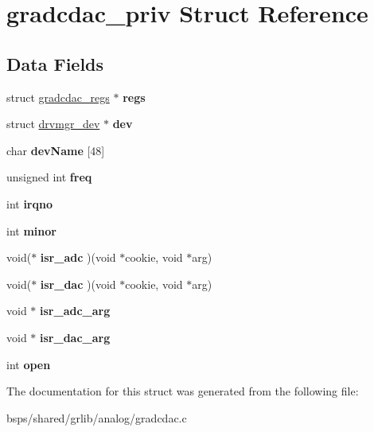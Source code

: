 \hypertarget{structgradcdac__priv}{}\section{gradcdac\+\_\+priv Struct Reference}
\label{structgradcdac__priv}
\subsection*{Data Fields}
\begin{DoxyCompactItemize}
\item 
\mbox{\label{structgradcdac__priv_a992cdd3b7a43e291069995f92ac0871b}} 
struct \mbox{\hyperlink{structgradcdac__regs}{gradcdac\+\_\+regs}} $\ast$ {\bfseries regs}
\item 
\mbox{\label{structgradcdac__priv_a717e51ae39ff3a310b2523e9cb597a23}} 
struct \mbox{\hyperlink{structdrvmgr__dev}{drvmgr\+\_\+dev}} $\ast$ {\bfseries dev}
\item 
\mbox{\label{structgradcdac__priv_ade3207082eb5ee36c30804dfd7cf3b6e}} 
char {\bfseries dev\+Name} \mbox{[}48\mbox{]}
\item 
\mbox{\label{structgradcdac__priv_ad278bb7e779b46d2b2be897f09dd3b17}} 
unsigned int {\bfseries freq}
\item 
\mbox{\label{structgradcdac__priv_aceb910e2050800956ed996a74cf465c0}} 
int {\bfseries irqno}
\item 
\mbox{\label{structgradcdac__priv_a4679eec5ca16f53d966d80656fc4f8ad}} 
int {\bfseries minor}
\item 
\mbox{\label{structgradcdac__priv_a0bbed6703322eb07b2efc5d75de0a5b2}} 
void($\ast$ {\bfseries isr\+\_\+adc} )(void $\ast$cookie, void $\ast$arg)
\item 
\mbox{\label{structgradcdac__priv_a4ff908996ab627da9632473d43910d86}} 
void($\ast$ {\bfseries isr\+\_\+dac} )(void $\ast$cookie, void $\ast$arg)
\item 
\mbox{\label{structgradcdac__priv_a51f64b326811df0c5c93ba64dbdfd6fa}} 
void $\ast$ {\bfseries isr\+\_\+adc\+\_\+arg}
\item 
\mbox{\label{structgradcdac__priv_a5886b28e6093d4ae148ce8e5baab1ee6}} 
void $\ast$ {\bfseries isr\+\_\+dac\+\_\+arg}
\item 
\mbox{\label{structgradcdac__priv_a748e869d62381c8a11d08c1d63a61ce0}} 
int {\bfseries open}
\end{DoxyCompactItemize}


The documentation for this struct was generated from the following file\+:\begin{DoxyCompactItemize}
\item 
bsps/shared/grlib/analog/gradcdac.\+c\end{DoxyCompactItemize}
